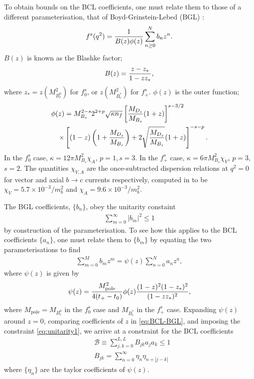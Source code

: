To obtain bounds on the BCL coefficients, one must relate them to those of a different parameterisation, that of Boyd-Grinstein-Lebed (BGL) \cite{GLENNBOYD1996493}:
\begin{align}
  f^s(q^2) = {1\over B(z)\phi(z)} \sum^N_{n\geq 0} b_n z^n.
\end{align}
$B(z)$ is known as the Blashke factor;
\begin{align}
  B(z) = { z - z_* \over 1 - z z_* },
\end{align}
where $z_* = z(M^2_{B_c^0})$ for $f_0^s$, or $z(M^2_{B_c^*})$ for $f_+^s$. $\phi(z)$ is the outer function;
\begin{align}
  \phi(z) &= M_{B_s}^{2-s} 2^{2+p} \sqrt{\kappa n_f}
  \left[ {M_{D_s}\over M_{B_s}} (1+z)\right]^{s-3/2} \nonumber \\
  \times &\left[ (1-z)\left(1+{M_{D_s}\over M_{B_s}}\right)+2\sqrt{M_{D_s}\over M_{B_s}}(1+z)\right]^{-s-p}.
\end{align}
In the $f^s_0$ case, $\kappa=12\pi M^2_{B_s}\chi_A$, $p=1$,\,$s=3$. In the $f^s_+$ case, $\kappa=6\pi M^2_{B_s} \chi_V$, $p=3$,\,$s=2$. The quantities $\chi_{V,A}$ are the once-subtracted dispersion relations at $q^2=0$ for vector and axial $b\to c$ currents respectively, computed in \cite{GLENNBOYD1996493} to be $\chi_V = 5.7\times 10^{-3}/m_b^2$ and $\chi_A = 9.6\times 10^{-3}/m_b^2$.

The BGL coefficients, $\{ b_n \}$, obey the unitarity constaint
\begin{align}
  \sum_{m=0}^{\infty} |b_m|^2 \leq 1
  \label{eq:unitarity1}
\end{align}
by construction of the parameterisation. To see how this applies to the BCL coefficients $\{ a_n \}$, one must relate them to $\{ b_m \}$ by equating the two parameterisations to find
\begin{align}
  \label{eq:BCL-BGL}
  \sum^M_{m=0} b_m z^m = \psi(z) \sum_{n=0}^N a_n z^n,
\end{align}
where $\psi(z)$ is given by
\begin{align}
  \psi(z) = { M_{\text{pole}}^2 \over 4(t_+ - t_0) } \phi(z) {(1-z)^2(1-z_*)^2\over (1-zz_*)^2 },
\end{align}
where $M_{\text{pole}}=M_{B_c^0}$ in the $f^s_0$ case and $M_{B_c^*}$ in the $f^s_+$ case. Expanding $\psi(z)$ around $z=0$, comparing coefficients of $z$ in \eqref{eq:BCL-BGL}, and imposing the constraint \eqref{eq:unitarity1}, we arrive at a constraint for the BCL coefficients
\begin{align}
    \label{eq:unitarity2}
    &\mathcal{B} \equiv \sum_{j,k=0}^{L,L} B_{jk} a_j a_k \leq 1 \\
    &B_{jk} = \sum_{n=0}^{\infty} \eta_n \eta_{n+|j-k|}
        \label{eq:Bmatrix}
\end{align}
where $\{\eta_n\}$ are the taylor coefficients of $\psi(z)$.

